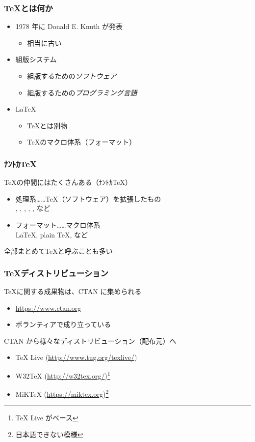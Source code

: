 \begin{frame}
	\frametitle{\TeX とは何か}
	\begin{itemize}
		\item 1978 年に Donald E. Knuth が発表
			\begin{itemize}
				\item 相当に古い
			\end{itemize}
		\item 組版システム
			\begin{itemize}
				\item 組版するための\emph{ソフトウェア}
				\item 組版するための\emph{プログラミング言語}
			\end{itemize}
			\pause
		\item \LaTeX
			\begin{itemize}
				\item \TeX とは別物
				\item \TeX のマクロ体系（フォーマット）
			\end{itemize}
	\end{itemize}
\end{frame}

\begin{frame}
	\frametitle{ﾅﾝﾄｶ\TeX}
	\TeX の仲間にはたくさんある（ﾅﾝﾄｶ\TeX ）
	\begin{itemize}
		\item 処理系……\TeX （ソフトウェア）を拡張したもの\\
			{\eTeX}, {\pdfTeX}, {\XeTeX}, {\LuaTeX}, {\pTeX}, {\upTeX} など
		\item フォーマット……マクロ体系\\
			{\LaTeX}, {plain \TeX}, {\ConTeXt} など
	\end{itemize}
	全部まとめて\TeX と呼ぶことも多い
\end{frame}

\begin{frame}
	\frametitle{\TeX ディストリビューション}
	\TeX に関する成果物は、CTAN に集められる
	\begin{itemize}
		\item \url{https://www.ctan.org}
		\item ボランティアで成り立っている
	\end{itemize}
	
	CTAN から様々なディストリビューション（配布元）へ
	\begin{itemize}
		\item {\TeX} Live (\url{http://www.tug.org/texlive/})
		\item W32TeX (\url{http://w32tex.org/})\footnote{{\TeX} Live がベース}
		\item MiK{\TeX} (\url{https://miktex.org})\footnote{日本語できない模様}
	\end{itemize}
\end{frame}

